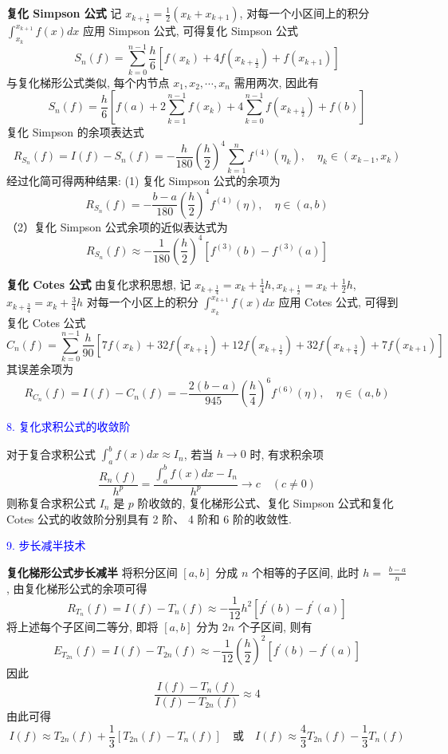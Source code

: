 \textbf{复化 Simpson 公式} \; 记 $ x_{k+\frac{1}{2}}=\frac{1}{2}\left(x_{k}+x_{k+1}\right) $, 对每一个小区间上的积分 $\displaystyle \int_{x_{k}}^{x_{k+1}} f(x) d x $ 应用 Simpson 公式, 可得复化 Simpson 公式
$$
S_{n}(f)=\sum_{k=0}^{n-1} \frac{h}{6}\left[f\left(x_{k}\right)+4 f\left(x_{k+\frac{1}{2}}\right)+f\left(x_{k+1}\right)\right]
$$
与复化梯形公式类似, 每个内节点 $ x_{1}, x_{2}, \cdots, x_{n} $ 需用两次, 因此有
$$
S_{n}(f)=\frac{h}{6}\left[f(a)+2 \sum_{k=1}^{n-1} f\left(x_{k}\right)+4 \sum_{k=0}^{n-1} f\left(x_{k+\frac{1}{2}}\right)+f(b)\right]
$$
复化 Simpson 的余项表达式
$$
R_{S_{n}}(f)=I(f)-S_{n}(f)=-\frac{h}{180}\left(\frac{h}{2}\right)^{4} \sum_{k=1}^{n} f^{(4)}\left(\eta_{k}\right), \quad \eta_{k} \in\left(x_{k-1}, x_{k}\right)
$$
经过化简可得两种结果:
(1) 复化 Simpson 公式的余项为
$$
R_{S_{n}}(f)=-\frac{b-a}{180}\left(\frac{h}{2}\right)^{4} f^{(4)}(\eta), \quad \eta \in(a, b)
$$
（2）复化 Simpson 公式余项的近似表达式为
$$
R_{S_{n}}(f) \approx-\frac{1}{180}\left(\frac{h}{2}\right)^{4}\left[f^{(3)}(b)-f^{(3)}(a)\right]
$$

\textbf{复化 Cotes 公式} \; 由复化求积思想, 记 $ x_{k+\frac{1}{4}}=x_{k}+\frac{1}{4} h, x_{k+\frac{1}{2}}=x_{k}+\frac{1}{2} h $, $ x_{k+\frac{3}{4}}=x_{k}+\frac{3}{4} h $ 对每一个小区上的积分 $\displaystyle \int_{x_{k}}^{x_{k+1}} f(x) d x $ 应用 Cotes 公式, 可得到复化 Cotes 公式
$$
C_{n}(f)=\sum_{k=0}^{n-1} \frac{h}{90}\left[7 f\left(x_{k}\right)+32 f\left(x_{k+\frac{1}{4}}\right)+12 f\left(x_{k+\frac{1}{2}}\right)+32 f\left(x_{k+\frac{3}{4}}\right)+7 f\left(x_{k+1}\right)\right]
$$
其误差余项为
$$
R_{C_{n}}(f)=I(f)-C_{n}(f)=-\frac{2(b-a)}{945}\left(\frac{h}{4}\right)^{6} f^{(6)}(\eta), \quad \eta \in(a, b)
$$

\textcolor{blue}{8. 复化求积公式的收敛阶}

对于复合求积公式 $\displaystyle \int_{a}^{b} f(x) d x \approx I_{n} $, 若当 $ h \rightarrow 0 $ 时, 有求积余项
$$
\frac{R_{n}(f)}{h^{p}}=\frac{\displaystyle\int_{a}^{b} f(x) d x-I_{n}}{h^{p}} \rightarrow c \quad(c \neq 0)
$$
则称复合求积公式 $ I_{n} $ 是 $ p $ 阶收敛的, 复化梯形公式、复化 Simpson 公式和复化 Cotes 公式的收敛阶分别具有 2 阶、 4 阶和 6 阶的收敛性.

\textcolor{blue}{9. 步长减半技术}

\textbf{复化梯形公式步长减半} \; 将积分区间 $ [a, b] $ 分成 $ n $ 个相等的子区间, 此时 $ h= $ $ \frac{b-a}{n} $, 由复化梯形公式的余项可得
$$
R_{T_{n}}(f)=I(f)-T_{n}(f) \approx-\frac{1}{12} h^{2}\left[f^{\prime}(b)-f^{\prime}(a)\right]
$$
将上述每个子区间二等分, 即将 $ [a, b] $ 分为 $ 2 n $ 个子区间, 则有
$$
E_{T_{2 n}}(f)=I(f)-T_{2 n}(f) \approx-\frac{1}{12}\left(\frac{h}{2}\right)^{2}\left[f^{\prime}(b)-f^{\prime}(a)\right]
$$
因此
$$
\frac{I(f)-T_{n}(f)}{I(f)-T_{2 n}(f)} \approx 4
$$
由此可得
$$
I(f) \approx T_{2 n}(f)+\frac{1}{3}\left[T_{2 n}(f)-T_{n}(f)\right]
\quad \text{或} \quad I(f) \approx \frac{4}{3} T_{2 n}(f)-\frac{1}{3} T_{n}(f)
$$

